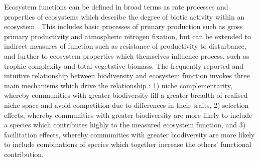 \documentclass[11pt,a4paper]{article}
\begin{document}
Ecosystem functions can be defined in broad terms as rate processes and properties of ecosystems which describe the degree of biotic activity within an ecosystem \citep{Jax2005}. This includes basic processes of primary production such as gross primary productivity and atmospheric nitrogen fixation, but can be extended to indirect measures of function such as resistance of productivity to disturbance, and further to ecosystem properties which themselves influence process, such as trophic complexity and total vegetative biomass. The frequently reported and intuitive relationship between biodiversity and ecosystem function invokes three main mechanisms which drive the relationship \citep{Tilman2014}: 1) niche complementarity, whereby communities with greater biodiversity fill a greater breadth of realised niche space and avoid competition due to differences in their traits, 2) selection effects, whereby communities with greater biodiversity are more likely to include a species which contributes highly to the measured ecosystem function, and 3) facilitation effects, whereby communities with greater biodiversity are more likely to include combinations of species which together increase the others' functional contribution.
\end{document}
